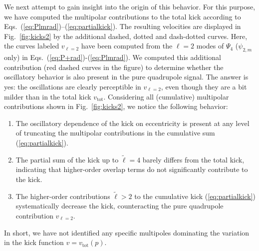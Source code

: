 \documentclass[floats,floatfix,showpacs,amssymb,physrev,twocolumn,superscriptaddress,reprint,
nofootinbib, longbibliography]{revtex4-2}
\newcounter{count}
\begin{document}
We next attempt to gain insight into the origin of this
behavior. For this purpose, we have computed the
multipolar contributions to the total kick according to
Eqs.~(\ref{eq:Plmrad})--(\ref{eq:partialkick}). The resulting
velocities are displayed in Fig.~\ref{fig:kicks2} by the additional
dashed, dotted and dash-dotted curves. 
Here, the curves labeled
$v_{\ell=2}$ have been computed from the $\ell=2$ modes of $\Psi_4$
($\psi_{2,m}$ only) in Eqs.~(\ref{eq:P+rad})-(\ref{eq:Plmrad}).
We computed this additional contribution (red dashed curves in the
figure) to determine whether the oscillatory behavior is also present
in the pure quadrupole signal. The answer is yes: the oscillations are
clearly perceptible in $v_{\ell=2}$, even though they are a bit milder
than in the total kick $v_{\mathrm{tot}}$. Considering all
(cumulative) multipolar contributions shown in Fig.~\ref{fig:kicks2},
we notice the following behavior:
%
\begin{enumerate}[label=(\arabic*)]
 \item The oscillatory dependence of the kick on eccentricity
       is present at any level of truncating the multipolar
       contributions in the cumulative sum (\ref{eq:partialkick}).
 \item The partial sum of the kick up to $\tilde{\ell}=4$
       barely differs from the total kick, indicating that
       higher-order overlap terms do not significantly
       contribute to the kick.
 \item The higher-order contributions $\tilde{\ell}>2$
       to the cumulative kick (\ref{eq:partialkick})
       systematically decrease the kick, counteracting
       the pure quadrupole contribution $v_{\ell=2}$.
\end{enumerate}
%
In short, we have not identified any specific multipoles
dominating the variation in the kick function $v=v_{\mathrm{tot}}(p)$.
\end{document}
